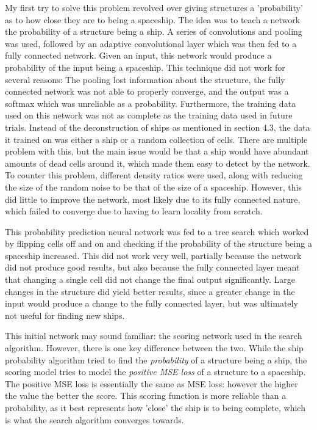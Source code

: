 \documentclass{l4proj}
\begin{document}
My first try to solve this problem revolved over giving structures a 'probability' as to how close they are to being a spaceship. The idea was to teach a network the probability of a structure being a ship. A series of convolutions and pooling was used, followed by an adaptive convolutional layer which was then fed to a fully connected network. Given an input, this network would produce a probability of the input being a spaceship. This technique did not work for several reasons: The pooling lost information about the structure, the fully connected network was not able to properly converge, and the output was a softmax which was unreliable as a probability. Furthermore, the training data used on this network was not as complete as the training data used in future trials. Instead of the deconstruction of ships as mentioned in section 4.3, the data it trained on was either a ship or a random collection of cells. There are multiple problem with this, but the main issue would be that a ship would have abundant amounts of dead cells around it, which made them easy to detect by the network. To counter this problem, different density ratios were used, along with reducing the size of the random noise to be that of the size of a spaceship. However, this did little to improve the network, most likely due to its fully connected nature, which failed to converge due to having to learn locality from scratch.

This probability prediction neural network was fed to a tree search which worked by flipping cells off and on and checking if the probability of the structure being a spaceship increased. This did not work very well, partially because the network did not produce good results, but also because the fully connected layer meant that changing a single cell did not change the final output significantly. Large changes in the structure did yield better results, since a greater change in the input would produce a change to the fully connected layer, but was ultimately not useful for finding new ships. 

This initial network may sound familiar: the scoring network used in the search algorithm. However, there is one key difference between the two. While the ship probability algorithm tried to find the \emph{probability} of a structure being a ship, the scoring model tries to model the \emph{positive MSE loss} of a structure to a spaceship. The positive MSE loss is essentially the same as MSE loss: however the higher the value the better the score. This scoring function is more reliable than a probability, as it best represents how 'close' the ship is to being complete, which is what the search algorithm converges towards.
\end{document}

